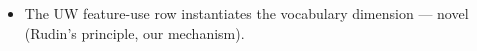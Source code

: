 \begin{itemize}
    \item The UW feature-use row instantiates the vocabulary dimension — novel (Rudin's principle, our mechanism). 

\end{itemize}
